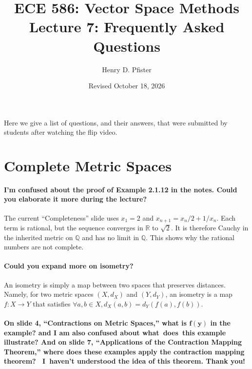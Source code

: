 \documentclass[10pt,english]{article}
\begin{document}
\title{ECE 586: Vector Space Methods \\ Lecture 7: Frequently Asked Questions}
\author{Henry D. Pfister \\ \univ}
\date{Revised October 18, 2026}

\maketitle

Here we give a list of questions, and their answers, that were submitted by students after watching the flip video.

\section{Complete Metric Spaces}

\paragraph{I'm confused about the proof of Example 2.1.12 in the notes. Could you elaborate it more during the lecture?}


The current ``Completeness'' slide uses $x_1=2$ and $x_{n+1}=x_n/2+1/x_n$.
Each term is rational, but the sequence converges in $\mathbb{R}$ to $\sqrt{2}$.
It is therefore Cauchy in the inherited metric on $\mathbb{Q}$ and has no limit in $\mathbb{Q}$.
This shows why the rational numbers are not complete.


\paragraph{Could you expand more on isometry?}

An isometry is simply a map between two spaces that preserves distances.
Namely, for two metric spaces $(X,d_X)$ and $(Y,d_Y)$, an isometry is a map $f: X \rightarrow Y$ that satisfies $\forall a,b \in X, d_X(a,b) = d_Y(f(a),f(b))$.

\paragraph{On slide 4, ``Contractions on Metric Spaces,'' what is $\boldsymbol{f(y)}$ in the example? and I am also confused about what does this example illustrate? And on slide 7, ``Applications of the Contraction Mapping Theorem,'' where does these examples apply the contraction mapping theorem?  I haven't understood the idea of this theorem. Thank you!}
\end{document}
